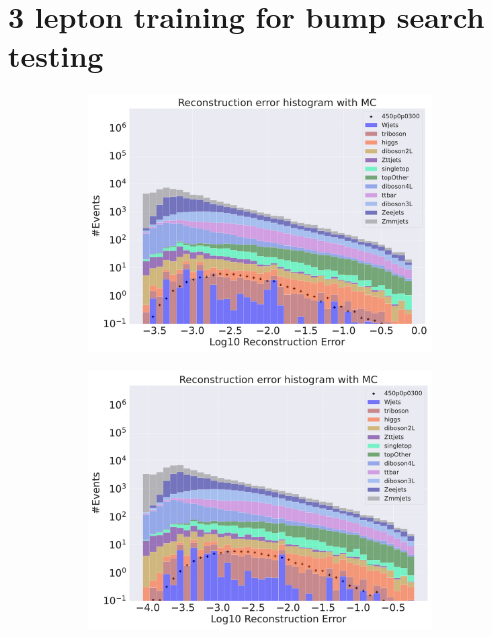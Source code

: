 
\section{3 lepton training for bump search testing}

\begin{figure}[H]
    \centering
    \begin{subfigure}{.45\textwidth}
        \includegraphics[width=\textwidth]{Figures/AE_testing/big/3lep/b_data_recon_big_rm3_feats_sig_450p0p0300.pdf}
        \caption{ }
        \label{fig:AE_3lep_big_450}
    \end{subfigure}
    \hfill
    \begin{subfigure}{.45\textwidth}
        \includegraphics[width=\textwidth]{Figures/AE_testing/small/3lep/b_data_recon_big_rm3_feats_sig_450p0p0300.pdf}

\end{subfigure}
\end{figure}
